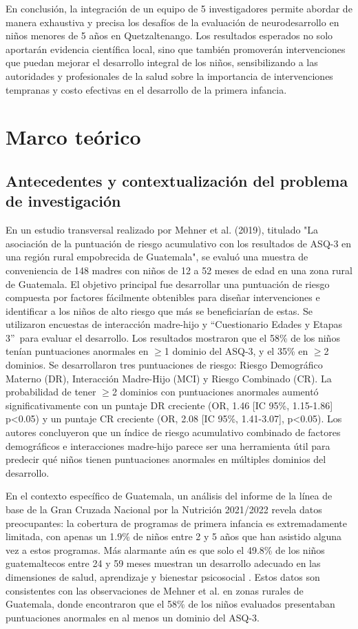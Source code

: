 \documentclass[11pt,letterpaper]{report}
\newcommand{\asq}{“Cuestionario Edades y Etapas 3”}
\begin{document}
En conclusión, la integración de un equipo de 5 investigadores permite abordar
de manera exhaustiva y precisa los desafíos de la evaluación de neurodesarrollo
en niños menores de 5 años en Quetzaltenango. Los resultados esperados no solo
aportarán evidencia científica local, sino que también promoverán
intervenciones que puedan mejorar el desarrollo integral de los niños,
sensibilizando a las autoridades y profesionales de la salud sobre la
importancia de intervenciones tempranas y costo efectivas en el desarrollo de
la primera infancia.

	\chapter{Marco teórico}
\section{Antecedentes y contextualización del problema de investigación}
En un estudio transversal realizado por Mehner et al. (2019), titulado "La
asociación de la puntuación de riesgo acumulativo con los resultados de ASQ-3
en una región rural empobrecida de Guatemala", se evaluó una muestra de
conveniencia de 148 madres con niños de 12 a 52 meses de edad en una zona
rural de Guatemala. El objetivo principal fue desarrollar una puntuación de
riesgo compuesta por factores fácilmente obtenibles para diseñar intervenciones
e identificar a los niños de alto riesgo que más se beneficiarían de estas.
Se utilizaron encuestas de interacción madre-hijo y \asq\ para evaluar el
desarrollo. Los resultados mostraron que el 58\% de los niños tenían
puntuaciones anormales en $\ge$1 dominio del ASQ-3, y el 35\% en $\ge$2
dominios. Se desarrollaron tres puntuaciones de riesgo: Riesgo Demográfico
Materno (DR), Interacción Madre-Hijo (MCI) y Riesgo Combinado (CR). La
probabilidad de tener $\ge$2 dominios con puntuaciones anormales aumentó
significativamente con un puntaje DR creciente (OR, 1.46 [IC 95\%, 1.15-1.86]
p<0.05) y un puntaje CR creciente (OR, 2.08 [IC 95\%, 1.41-3.07], p<0.05). Los
autores concluyeron que un índice de riesgo acumulativo combinado de factores
demográficos e interacciones madre-hijo parece ser una herramienta útil para
predecir qué niños tienen puntuaciones anormales en múltiples dominios del
desarrollo. \cite{CMehner2019}

En el contexto específico de Guatemala, un análisis del informe de la  línea de
base de la Gran Cruzada Nacional por la Nutrición 2021/2022 revela  datos
preocupantes: la cobertura de programas de primera infancia es extremadamente
limitada, con apenas un 1.9\% de niños entre 2 y 5 años que han asistido alguna
vez a estos programas. Más alarmante aún es que solo el 49.8\% de los niños
guatemaltecos entre 24 y 59 meses muestran un desarrollo adecuado  en las
dimensiones de salud, aprendizaje y bienestar psicosocial \cite{SESAN2022}.
Estos datos son consistentes con las observaciones de Mehner et al.
\cite{CMehner2019} en zonas rurales de Guatemala, donde encontraron que el 58\%
de los niños evaluados presentaban puntuaciones anormales en al menos un
dominio del ASQ-3.
\end{document}
